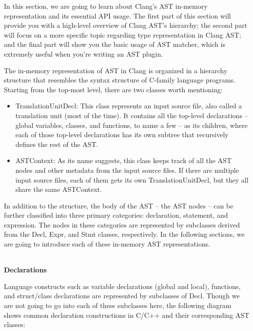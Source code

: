 
In this section, we are going to learn about Clang's AST in-memory representation and its essential API usage. The first part of this section will provide you with a high-level overview of Clang AST's hierarchy; the second part will focus on a more specific topic regarding type representation in Clang AST; and the final part will show you the basic usage of AST matcher, which is extremely useful when you're writing an AST plugin.


The in-memory representation of AST in Clang is organized in a hierarchy structure that resembles the syntax structure of C-family language programs. Starting from the top-most level, there are two classes worth mentioning:

\begin{itemize}
\item TranslationUnitDecl: This class represents an input source file, also called a translation unit (most of the time). It contains all the top-level declarations – global variables, classes, and functions, to name a few – as its children, where each of those top-level declarations has its own subtree that recursively defines the rest of the AST.

\item ASTContext: As its name suggests, this class keeps track of all the AST nodes and other metadata from the input source files. If there are multiple input source files, each of them gets its own TranslationUnitDecl, but they all share the same ASTContext.
\end{itemize}

In addition to the structure, the body of the AST – the AST nodes – can be further classified into three primary categories: declaration, statement, and expression. The nodes in these categories are represented by subclasses derived from the Decl, Expr, and Stmt classes, respectively. In the following sections, we are going to introduce each of these in-memory AST representations.

\hspace*{\fill} \\ %
\noindent
\textbf{Declarations}

Language constructs such as variable declarations (global and local), functions, and struct/class declarations are represented by subclasses of Decl. Though we are not going to go into each of these subclasses here, the following diagram shows common declaration constructions in C/C++ and their corresponding AST classes:

